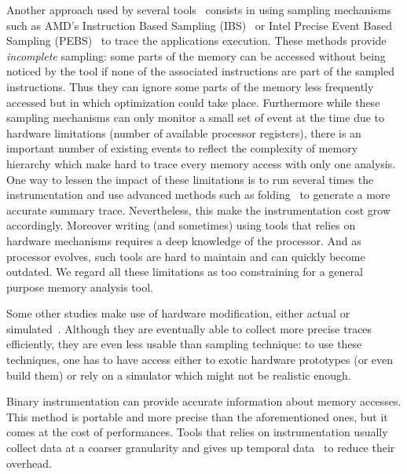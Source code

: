 Another approach used by several
tools~\cite{Lachaize12MemProf,McCurdy10Memphis,Liu14Tool,Gimenez14Dissecting}
consists in using sampling mechanisms such as AMD's Instruction Based Sampling
(IBS)~\cite{Drongowski07Instructionbased} or Intel Precise Event Based
Sampling (PEBS)~\cite{Levinthal2009} to trace the applications execution. These methods
provide \emph{incomplete} sampling: some parts of the memory can be accessed without
being noticed by the tool if none of the associated instructions are part of the sampled
instructions.
Thus they can ignore some parts of the memory less frequently accessed but in which
optimization could take place.
Furthermore while these sampling mechanisms can only monitor a small set of event
at the time due to hardware limitations (number of available processor
registers), there is an important number of existing events to reflect the
complexity of memory hierarchy which make hard to trace every memory
access with only one analysis.
One way to lessen the impact of these limitations is to run several times the
instrumentation and use advanced methods such as
folding~\cite{Servat15Towards} to generate a more accurate summary trace.
Nevertheless, this make the instrumentation cost grow accordingly.
Moreover writing (and sometimes) using tools that relies on hardware mechanisms
requires a deep knowledge of the processor. And as processor evolves,
such tools are hard to maintain and can quickly become outdated.
We regard all these limitations as too constraining for a general purpose
memory analysis tool.

Some other studies make use of hardware modification, either actual or
simulated~\cite{Bao08HMTT,Martonosi92MemSpy}.  Although they are eventually able to collect
more precise traces efficiently, they are even less usable than sampling technique: to use
these techniques, one has to have access either to exotic hardware prototypes
(or even build them) or rely on a simulator which might not be realistic
enough.

Binary instrumentation can provide accurate information about memory accesses.
This method is portable and  more precise than the aforementioned ones,
but it comes at the cost of performances. 
Tools that relies on instrumentation usually collect data at a coarser granularity and gives up temporal
data~\cite{Beniamine15TABARNAC} to reduce their overhead.


